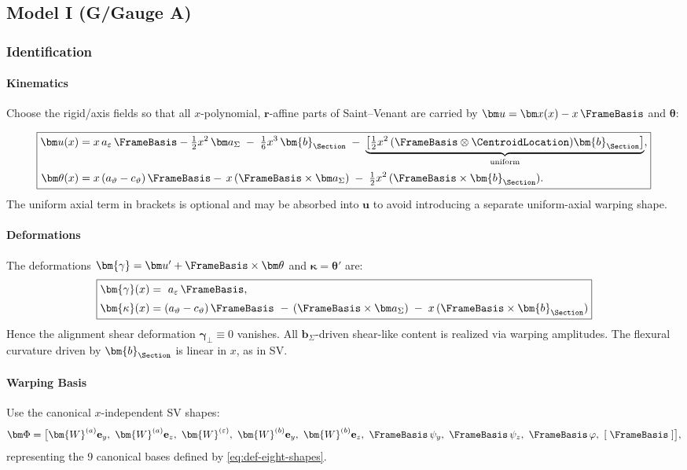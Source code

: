 \subsection{Model I (G/Gauge A)}

\subsubsection{Identification}
\paragraph{Kinematics}
Choose the rigid/axis fields so that all \(x\)-polynomial, \(\bm{r}\)-affine parts of Saint–Venant are carried by \(\bm u=\bm x(x)-x\,\FrameBasis\) and \(\bm\theta\):

\begin{equation}
\boxed{
\begin{aligned}
\bm u(x)&=
x\,a_\varepsilon\,\FrameBasis
-\tfrac{1}{2} x^2\,\bm a_\Sigma\;-\;\tfrac16 x^3\,\bm{b}_{\Section}
\;-\;\underbrace{\left[\tfrac{1}{2} x^2\,(\FrameBasis\otimes\CentroidLocation)\bm{b}_{\Section}\right]}_{\text{uniform}},\\[2pt]
\bm\theta(x)&= x\,(a_\vartheta-c_\vartheta)\,\FrameBasis- \,x\,(\FrameBasis\times\bm a_\Sigma)\;-\;\tfrac{1}{2} x^2\,(\FrameBasis\times\bm{b}_{\Section}).
\end{aligned}}
\end{equation}
The uniform axial term in brackets is optional and may be absorbed into \(\bm u\) to avoid introducing a separate uniform-axial warping shape.

\paragraph{Deformations}
The deformations \(\bm{\gamma}=\bm u'+\FrameBasis\times\bm\theta\) and \(\bm{\kappa}=\bm\theta'\) are:
\[
\boxed{
\begin{aligned}
\bm{\gamma}(x)&=\ a_\varepsilon\,\FrameBasis,\\[2pt]
\bm{\kappa}(x)&=
(a_\vartheta-c_\vartheta)\,\FrameBasis
\ -\,(\FrameBasis\times\bm a_\Sigma)\;-\;x\,(\FrameBasis\times\bm{b}_{\Section})
\end{aligned}}
\]
Hence the alignment shear deformation \(\bm{\gamma}_\perp\equiv 0\) vanishes. 
All \(\bm b_\Sigma\)-driven shear-like content is realized via warping amplitudes.
The flexural curvature driven by \(\bm{b}_{\Section}\) is linear in \(x\), as in SV.

\paragraph{Warping Basis}
Use the canonical \(x\)-independent SV shapes:
\[
\bm\Phi=\big[
\bm{W}^{(a)}\mathbf{e}_y,\ \bm{W}^{(a)}\mathbf{e}_z,\ \bm{W}^{(\varepsilon)},\
\bm{W}^{(b)}\mathbf{e}_y,\ \bm{W}^{(b)}\mathbf{e}_z,\
\FrameBasis\,\psi_{y},\ \FrameBasis\,\psi_{z},\ \FrameBasis\,\varphi,\ 
[\;\FrameBasis\;]
\big],
\]
representing the 9 canonical bases defined by \eqref{eq:def-eight-shapes}.

